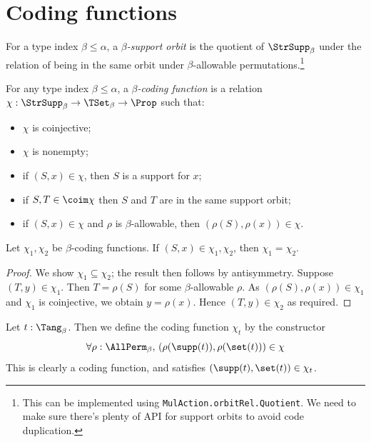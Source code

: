 \section{Coding functions}
\begin{definition}
  \label{def:SupportOrbit}
  For a type index \( \beta \leq \alpha \), a \emph{\( \beta \)-support orbit} is the quotient of \( \StrSupp_\beta \) under the relation of being in the same orbit under \( \beta \)-allowable permutations.\footnote{This can be implemented using \texttt{MulAction.orbitRel.Quotient}. We need to make sure there's plenty of API for support orbits to avoid code duplication.}
\end{definition}
\begin{definition}
  \label{def:CodingFunction}
  For any type index \( \beta \leq \alpha \), a \emph{\( \beta \)-coding function} is a relation \( \chi : \StrSupp_\beta \to \TSet_\beta \to \Prop \) such that:
  \begin{itemize}
    \item \( \chi \) is coinjective;
    \item \( \chi \) is nonempty;
    \item if \( (S, x) \in \chi \), then \( S \) is a support for \( x \);
    \item if \( S, T \in \coim \chi \) then \( S \) and \( T \) are in the same support orbit;
    \item if \( (S, x) \in \chi \) and \( \rho \) is \( \beta \)-allowable, then \( (\rho(S), \rho(x)) \in \chi \).
  \end{itemize}
\end{definition}
\begin{proposition}
  \label{prop:CodingFunction.ext}
  Let \( \chi_1, \chi_2 \) be \( \beta \)-coding functions.
  If \( (S, x) \in \chi_1, \chi_2 \), then \( \chi_1 = \chi_2 \).
\end{proposition}
\begin{proof}
  We show \( \chi_1 \subseteq \chi_2 \); the result then follows by antisymmetry.
  Suppose \( (T, y) \in \chi_1 \).
  Then \( T = \rho(S) \) for some \( \beta \)-allowable \( \rho \).
  As \( (\rho(S), \rho(x)) \in \chi_1 \) and \( \chi_1 \) is coinjective, we obtain \( y = \rho(x) \).
  Hence \( (T, y) \in \chi_2 \) as required.
\end{proof}
\begin{definition}
  \label{def:code}
  Let \( t : \Tang_\beta \).
  Then we define the coding function \( \chi_t \) by the constructor
  \[ \forall \rho : \AllPerm_\beta,\, (\rho(\supp(t)), \rho(\set(t))) \in \chi \]
  This is clearly a coding function, and satisfies \( (\supp(t), \set(t)) \in \chi_t \).
\end{definition}
